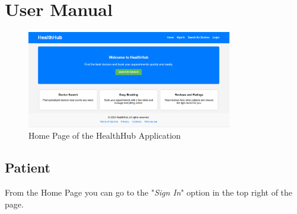 \chapter{User Manual}
\begin{figure}[H]
	\centering
	\includegraphics[width=0.8\textwidth]{resources/homepage.png}
	\caption{Home Page of the HealthHub Application}
	\label{fig:homepage}
\end{figure}

\section{Patient}
From the Home Page you can go to the "\textit{Sign In}" option in the top right of the page. 

